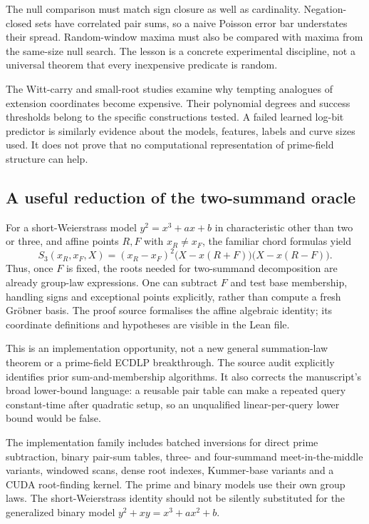 The null comparison must match sign closure as well as cardinality.
Negation-closed sets have correlated pair sums, so a naive Poisson error
bar understates their spread. Random-window maxima must also be compared
with maxima from the same-size null search. The lesson is a concrete
experimental discipline, not a universal theorem that every inexpensive
predicate is random.

The Witt-carry and small-root studies examine why tempting analogues of
extension coordinates become expensive. Their polynomial degrees and
success thresholds belong to the specific constructions tested. A
failed learned log-bit predictor is similarly evidence about the models,
features, labels and curve sizes used. It does not prove that no
computational representation of prime-field structure can help.

\subsection{A useful reduction of the two-summand oracle}

For a short-Weierstrass model $y^2=x^3+ax+b$ in characteristic other
than two or three, and affine points $R,F$ with
$x_R\ne x_F$, the familiar chord formulas yield
\[
 S_3(x_R,x_F,X)=(x_R-x_F)^2
       \bigl(X-x(R+F)\bigr)\bigl(X-x(R-F)\bigr).
\]
Thus, once $F$ is fixed, the roots needed for two-summand decomposition
are already group-law expressions. One can subtract $F$ and test base
membership, handling signs and exceptional points explicitly, rather than
compute a fresh Gr\"obner basis. The proof source formalises the affine
algebraic identity; its coordinate definitions and hypotheses are visible
in the Lean file.

This is an implementation opportunity, not a new general summation-law
theorem or a prime-field ECDLP breakthrough. The source audit explicitly
identifies prior sum-and-membership algorithms. It also corrects the
manuscript's broad lower-bound language: a reusable pair table can make a
repeated query constant-time after quadratic setup, so an unqualified
linear-per-query lower bound would be false.

The implementation family includes batched inversions for direct prime
subtraction, binary pair-sum tables, three- and four-summand meet-in-the-middle
variants, windowed scans, dense root indexes, Kummer-base variants and a
CUDA root-finding kernel. The prime and binary models use their own group
laws. The short-Weierstrass identity should not be silently substituted
for the generalized binary model $y^2+xy=x^3+ax^2+b$.


